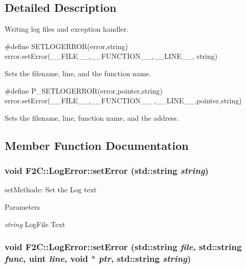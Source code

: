 \subsection{Detailed Description}
Writing log files and exception handler. \par
 
\begin{DoxyCode}
 #define SETLOGERROR(error,string) error.setError(__FILE__,__FUNCTION__,__LINE__,
      string) 
\end{DoxyCode}
 Sets the filename, line, and the function name. \par
 
\begin{DoxyCode}
 #define P_SETLOGERROR(error,pointer,string) error.setError(__FILE__,__FUNCTION__
      ,__LINE__,pointer,string) 
\end{DoxyCode}
 Sets the filename, line, function name, and the address. 

\subsection{Member Function Documentation}
\hypertarget{class_f2_c_1_1_log_error_ac571b7a599761f5ed869832b023a3d92}{
\subsubsection[{setError}]{\setlength{\rightskip}{0pt plus 5cm}void F2C::LogError::setError (std::string {\em string})}}
\label{class_f2_c_1_1_log_error_ac571b7a599761f5ed869832b023a3d92}


setMethode: Set the Log text 
\begin{DoxyParams}{Parameters}
\item[{\em string}]LogFile Text \end{DoxyParams}
\hypertarget{class_f2_c_1_1_log_error_a37013f16d6418b8881c8df0be43909c6}{
\subsubsection[{setError}]{\setlength{\rightskip}{0pt plus 5cm}void F2C::LogError::setError (std::string {\em file}, \/  std::string {\em func}, \/  {\bf uint} {\em line}, \/  void $\ast$ {\em ptr}, \/  std::string {\em string})}}
\label{class_f2_c_1_1_log_error_a37013f16d6418b8881c8df0be43909c6}


